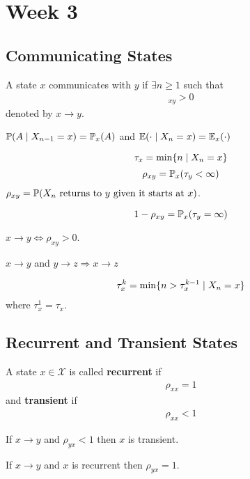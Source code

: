\documentclass[12pt,a4paper]{article}
\begin{document}
\section{Week 3}
\subsection{Communicating States}
\begin{defn}
A state $x$ communicates with $y$ if $\exists n\geq 1$ such that 
\begin{align*}
[\vb P^n]_{xy} > 0
\end{align*}
denoted by $x \to y$. 
\end{defn}
\begin{note}
$\P(A \given X_{n-1} = x) = \P_x(A)$ and $\E(\cdot \given X_n = x) = \E_x(\cdot)$
\end{note}
\begin{defn}
\[\tau_x = \min \{n \given X_n = x\}\]
\[\rho_{xy} = \P_x(\tau_y < \infty)\]
$\rho_{xy} = \P(\text{$X_n$ returns to $y$ given it starts at $x$)}$. 
\end{defn}
\begin{note}
\[1 - \rho_{xy} = \P_x(\tau_y = \infty)\]
\end{note}
\begin{lemma}
$x\to y \iff \rho_{xy} > 0$.  
\end{lemma}
\begin{lemma}[Transitivity]
$x\to y$ and $y\to z \Rightarrow x \to z$
\end{lemma}
\begin{defn}
\label{kthret}
\begin{align*}
\tau_x^k = \min \{n > \tau_x^{k-1} \given X_n = x\}
\end{align*}
where $\tau_x^1 = \tau_x$. 
\end{defn}
\subsection{Recurrent and Transient States}
\begin{defn}
\label{recurrent}
A state $x\in \mathcal{X}$ is called \textbf{recurrent} if 
\begin{align*}
\rho_{xx} = 1
\end{align*}
and \textbf{transient} if 
\begin{align*}
\rho_{xx} < 1
\end{align*}
\end{defn}
\begin{thm}
\label{escpath}
If $x\to y$ and $\rho_{yx} < 1$ then $x$ is transient.
\end{thm}
\begin{thm}
If $x\to y$ and $x$ is recurrent then $\rho_{yx} = 1$. 
\end{thm}
\newpage
\end{document}
